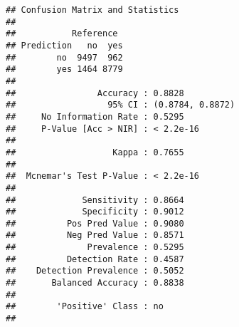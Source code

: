 \documentclass[
]{article}
\newenvironment{Shaded}{\begin{snugshade}}{\end{snugshade}}
\newcommand{\AttributeTok}[1]{\textcolor[rgb]{0.13,0.29,0.53}{#1}}
\newcommand{\CommentTok}[1]{\textcolor[rgb]{0.56,0.35,0.01}{\textit{#1}}}
\newcommand{\ConstantTok}[1]{\textcolor[rgb]{0.56,0.35,0.01}{#1}}
\newcommand{\DecValTok}[1]{\textcolor[rgb]{0.00,0.00,0.81}{#1}}
\newcommand{\FloatTok}[1]{\textcolor[rgb]{0.00,0.00,0.81}{#1}}
\newcommand{\FunctionTok}[1]{\textcolor[rgb]{0.13,0.29,0.53}{\textbf{#1}}}
\newcommand{\NormalTok}[1]{#1}
\newcommand{\OtherTok}[1]{\textcolor[rgb]{0.56,0.35,0.01}{#1}}
\newcommand{\SpecialCharTok}[1]{\textcolor[rgb]{0.81,0.36,0.00}{\textbf{#1}}}
\newcommand{\StringTok}[1]{\textcolor[rgb]{0.31,0.60,0.02}{#1}}
\begin{document}
\begin{verbatim}
## Confusion Matrix and Statistics
## 
##           Reference
## Prediction   no  yes
##        no  9497  962
##        yes 1464 8779
##                                           
##                Accuracy : 0.8828          
##                  95% CI : (0.8784, 0.8872)
##     No Information Rate : 0.5295          
##     P-Value [Acc > NIR] : < 2.2e-16       
##                                           
##                   Kappa : 0.7655          
##                                           
##  Mcnemar's Test P-Value : < 2.2e-16       
##                                           
##             Sensitivity : 0.8664          
##             Specificity : 0.9012          
##          Pos Pred Value : 0.9080          
##          Neg Pred Value : 0.8571          
##              Prevalence : 0.5295          
##          Detection Rate : 0.4587          
##    Detection Prevalence : 0.5052          
##       Balanced Accuracy : 0.8838          
##                                           
##        'Positive' Class : no              
## 
\end{verbatim}

\begin{Shaded}
\end{Shaded}
\end{document}
